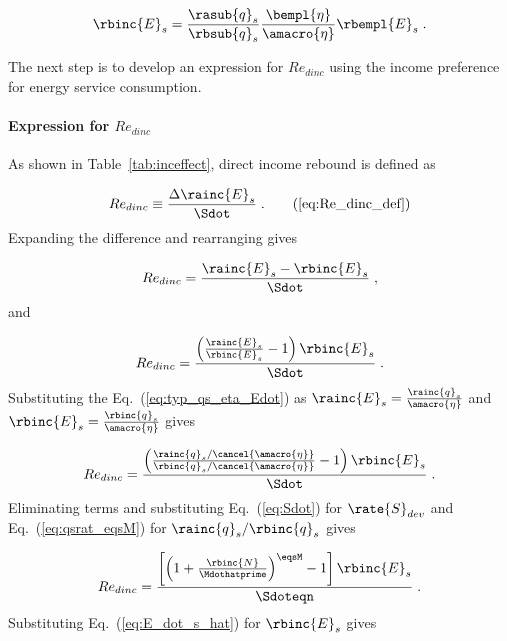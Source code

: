 \begin{equation} \label{eq:E_dot_s_hat}
  \rbinc{E}_s = \frac{\rasub{q}_s}{\rbsub{q}_s}
                \frac{\bempl{\eta}}{\amacro{\eta}}
                \rbempl{E}_s \; .
\end{equation}

The next step is to develop an expression for $Re_{dinc}$
using the income preference for energy service consumption.


\paragraph{Expression for $Re_{dinc}$}
\label{sec:Re_dinc}

As shown in Table~\ref{tab:inceffect}, direct income rebound is defined as

\begin{equation}
  Re_{dinc} \equiv \frac{\Delta \rainc{E}_s}{\Sdot} \; . \tag{\ref{eq:Re_dinc_def}}
\end{equation}
%
Expanding the difference and rearranging gives

\begin{equation}
  Re_{dinc} = \frac{\rainc{E}_s - \rbinc{E}_s}{\Sdot} \; , 
\end{equation}
%
and

\begin{equation}
  Re_{dinc} = \frac{\left( \frac{\rainc{E}_s}{\rbinc{E}_s} - 1  \right) \rbinc{E}_s}{\Sdot} \; .
\end{equation}
%
Substituting the Eq.~(\ref{eq:typ_qs_eta_Edot}) as
$\rainc{E}_s = \frac{\rainc{q}_s}{\amacro{\eta}}$ and  
$\rbinc{E}_s = \frac{\rbinc{q}_s}{\amacro{\eta}}$ gives

\begin{equation}
  Re_{dinc} = \frac{\left( \frac{\rainc{q}_s / \cancel{\amacro{\eta}}}{\rbinc{q}_s / \cancel{\amacro{\eta}}} - 1  \right) \rbinc{E}_s} 
              {\Sdot} \; .
\end{equation}
%
Eliminating terms and substituting Eq.~(\ref{eq:Sdot}) for $\rate{S}_{dev}$ and
Eq.~(\ref{eq:qsrat_eqsM}) for $\rainc{q}_s / \rbinc{q}_s$ gives

\begin{equation}
  Re_{dinc} = \frac{\left[ \left( 1 + \frac{\rbinc{N}}{\Mdothatprime} \right) ^{\eqsM} - 1  \right] \rbinc{E}_s} 
              {\Sdoteqn} \; .
\end{equation}
%
Substituting Eq.~(\ref{eq:E_dot_s_hat}) for $\rbinc{E}_s$ gives

